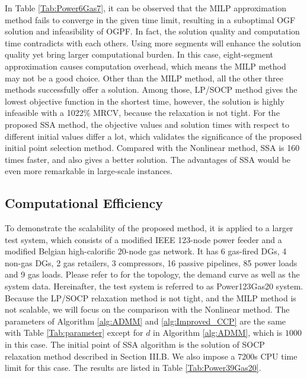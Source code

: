 \documentclass[journal]{IEEEtran}
\begin{document}
In Table \ref{Tab:Power6Gas7}, it can be observed that the MILP approximation method fails to converge in the given time limit, resulting in a suboptimal OGF solution and infeasibility of OGPF. In fact, the solution quality and computation time contradicts with each others. Using more segments will enhance the solution quality yet bring larger computational burden. In this case, eight-segment approximation causes computation overhead, which means the MILP method may not be a good choice. Other than the MILP method, all the other three methods successfully offer a solution. Among those, LP/SOCP method gives the lowest objective function in the shortest time, however, the solution is highly infeasible with a 1022\% MRCV, because the relaxation is not tight. For the proposed SSA method, the objective values and solution times with respect to different initial values differ a lot, which validates the significance of the proposed initial point selection method. Compared with the Nonlinear method, SSA is 160 times faster, and also gives a better solution. The advantages of SSA would be even more remarkable in large-scale instances.

\subsection{Computational Efficiency}

To demonstrate the scalability of the proposed method, it is applied to a larger test system, which consists of a modified IEEE 123-node power feeder and a modified Belgian high-calorific 20-node gas network. It has 6 gas-fired DGs, 4 non-gas DGs, 2 gas retailers, 3 compressors, 16 passive pipelines, 85 power loads and 9 gas loads. Please refer to \cite{Power6Gas7} for the topology, the demand curve as well as the system data. Hereinafter, the test system is referred to as Power123Gas20 system. Because the LP/SOCP relaxation method is not tight, and the MILP method is not scalable, we will focus on the comparison with the Nonlinear method. The parameters of Algorithm \ref{alg:ADMM} and \ref{alg:Improved_CCP} are the same with Table \ref{Tab:parameter} except for $d$ in Algorithm \ref{alg:ADMM}, which is $1000$ in this case. The initial point of SSA algorithm is the solution of SOCP relaxation method described in Section III.B. We also impose a 7200s CPU time limit for this case. The results are listed in Table \ref{Tab:Power39Gas20}.
\end{document}
